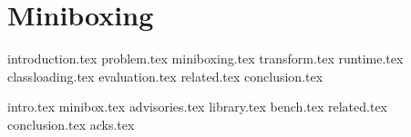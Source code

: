 \chapter{Miniboxing}


{introduction.tex}
{problem.tex}
{miniboxing.tex}
{transform.tex}
{runtime.tex}
{classloading.tex}
{evaluation.tex}
{related.tex}
{conclusion.tex}

{intro.tex}
{minibox.tex}
{advisories.tex}
{library.tex}
{bench.tex}
{related.tex}
{conclusion.tex}
{acks.tex}

